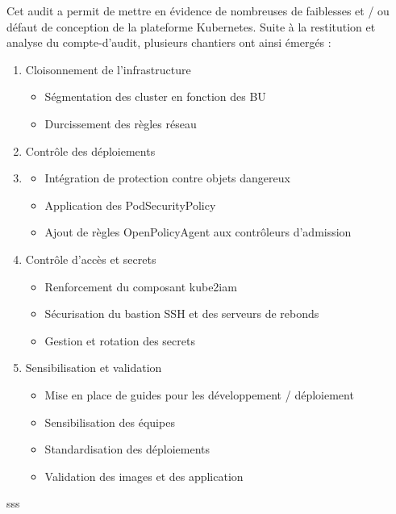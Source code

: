 Cet audit a permit de mettre en évidence de nombreuses de faiblesses et / ou défaut de conception de la plateforme Kubernetes. 
Suite à la restitution et analyse du compte-d'audit, plusieurs chantiers ont ainsi émergés :
\begin{enumerate}
    \item Cloisonnement de l'infrastructure
    \begin{itemize}
        \item Ségmentation des cluster en fonction des \ac{BU}
        \item Durcissement des règles réseau
    \end{itemize}
    \item Contrôle des déploiements
    \item \begin{itemize}
        \item Intégration de protection contre objets dangereux
        \item Application des PodSecurityPolicy
        \item Ajout de règles OpenPolicyAgent aux contrôleurs d'admission
    \end{itemize}
    \item Contrôle d'accès et secrets
    \begin{itemize}
        \item Renforcement du composant kube2iam
        \item Sécurisation du bastion SSH et des serveurs de rebonds
        \item Gestion et rotation des secrets
    \end{itemize}
    \item Sensibilisation et validation
    \begin{itemize}
        \item Mise en place de guides pour les développement / déploiement
        \item Sensibilisation des équipes
        \item Standardisation des déploiements
        \item Validation des images et des application
    \end{itemize}
\end{enumerate}

\pagebreak

sss